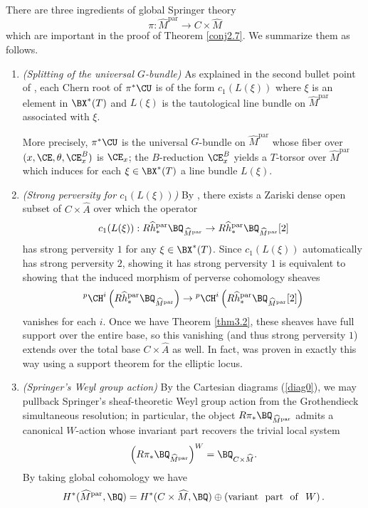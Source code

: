 There are three ingredients of global Springer theory
\[
\pi: \widehat{M}^\mathrm{par} \to C \times \widehat{M}
\]
which are important in the proof of Theorem \ref{conj2.7}. We summarize them as follows.
\begin{enumerate}
    \item[(A)] \emph{(Splitting of the universal $G$-bundle)} As explained in the second bullet point of \cite[Construction 6.1.4]{Yun1}, each Chern root of $\pi^*\CU$ is of the form $c_1(L(\xi))$ where $\xi$ is an element in $\BX^*(T)$ and $L(\xi)$ is the tautological line bundle on $\widehat{M}^{\mathrm{par}}$ associated with $\xi$.

    More precisely, $\pi^*\CU$ is the universal $G$-bundle on $\widehat{M}^{\mathrm{par}}$ whose fiber over $(x,\CE,\theta, \CE^B_x)$ is $\CE_x$; the $B$-reduction $\CE_x^B$ yields a $T$-torsor over $\widehat{M}^{\mathrm{par}}$ which induces for each $\xi \in \BX^*(T)$ a line bundle $L(\xi)$.


    \item[(B)] \emph{(Strong perversity for $c_1(L(\xi))$)} By \cite[Lemma 3.2.3]{Yun2}, there exists a Zariski dense open subset of $C\times \widehat{A}$ over which the operator
    \[
c_1(L(\xi)): R\widehat{h}^{\mathrm{par}}_*\BQ_{\widehat{M}^{\mathrm{par}}} \to R\widehat{h}^{\mathrm{par}}_*\BQ_{\widehat{M}^{\mathrm{par}}}[2]    \]
has strong perversity $1$ for any $\xi \in \BX^*(T)$.
Since $c_1(L(\xi))$ automatically has strong perversity $2$, showing it has strong perversity $1$ is equivalent to showing that the induced morphism of perverse cohomology sheaves
\[
{}^{p}\CH^i\left( R\widehat{h}^{\mathrm{par}}_*\BQ_{\widehat{M}^{\mathrm{par}}}\right)\rightarrow
{}^{p}\CH^i\left(R\widehat{h}^{\mathrm{par}}_*\BQ_{\widehat{M}^{\mathrm{par}}}[2]\right)
\]
vanishes for each $i$.  Once we have Theorem \ref{thm3.2}, these sheaves have full support over the entire base, so this vanishing (and thus strong perversity $1$) extends over the total base $C \times \widehat{A}$ as well.
In fact, \cite[Lemma 3.2.3]{Yun2} was proven in exactly this way using a support theorem \cite[Section 4.6.2]{Yun2} for the elliptic locus.


    \item[(C)] \emph{(Springer's Weyl group action)} By the Cartesian diagrams (\ref{diag0}), we may pullback Springer's sheaf-theoretic Weyl group action from the Grothendieck simultaneous resolution; in particular, the object $R\pi_* \BQ_{\widehat{M}^{\mathrm{par}}}$ admits a canonical $W$-action whose invariant part recovers the trivial local system
    \[
\left(R\pi_* \BQ_{\widehat{M}^{\mathrm{par}}} \right)^W = \BQ_{C\times \widehat{M}}.  \]
By taking global cohomology we have
\[
H^*(\widehat{M}^{\mathrm{par}}, \BQ) = H^*(C\times \widehat{M}, \BQ) \oplus \left(\mathrm{variant~~part~~of~~} W \right).
\]
\end{enumerate}

